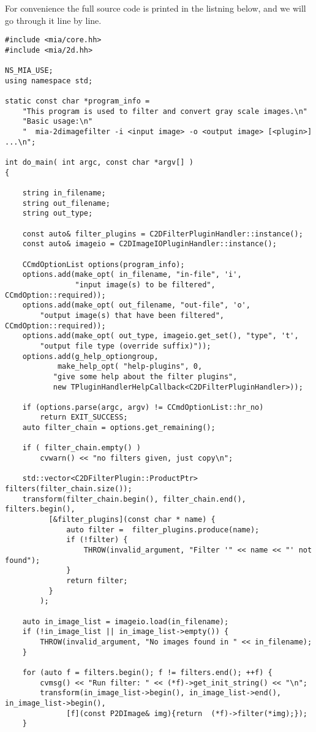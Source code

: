 \documentclass[english, 10pt, a4paper,headsepline,openany]{scrbook}
\begin{document}
For convenience the full source code is printed in the listning below, and we will go through it line by line. 
\lstset{language=c++,basicstyle=\small,numberstyle=\small}
\begin{lstlisting}
#include <mia/core.hh>
#include <mia/2d.hh>

NS_MIA_USE;
using namespace std;

static const char *program_info = 
	"This program is used to filter and convert gray scale images.\n"
	"Basic usage:\n"
	"  mia-2dimagefilter -i <input image> -o <output image> [<plugin>] ...\n"; 

int do_main( int argc, const char *argv[] )
{

	string in_filename;
	string out_filename;
	string out_type;

	const auto& filter_plugins = C2DFilterPluginHandler::instance();
	const auto& imageio = C2DImageIOPluginHandler::instance();

	CCmdOptionList options(program_info);
	options.add(make_opt( in_filename, "in-file", 'i', 
                "input image(s) to be filtered", CCmdOption::required));
	options.add(make_opt( out_filename, "out-file", 'o',
		"output image(s) that have been filtered", CCmdOption::required));
	options.add(make_opt( out_type, imageio.get_set(), "type", 't',
		"output file type (override suffix)"));
	options.add(g_help_optiongroup, 
	        make_help_opt( "help-plugins", 0,
		   "give some help about the filter plugins", 
	  	   new TPluginHandlerHelpCallback<C2DFilterPluginHandler>));
	
	if (options.parse(argc, argv) != CCmdOptionList::hr_no)
		return EXIT_SUCCESS; 
	auto filter_chain = options.get_remaining();

	if ( filter_chain.empty() )
		cvwarn() << "no filters given, just copy\n";

	std::vector<C2DFilterPlugin::ProductPtr> filters(filter_chain.size());
	transform(filter_chain.begin(), filter_chain.end(), filters.begin(),
		  [&filter_plugins](const char * name) {
			  auto filter =  filter_plugins.produce(name); 
			  if (!filter) {
				  THROW(invalid_argument, "Filter '" << name << "' not found"); 
			  }
			  return filter; 
		  }
		); 
		
	auto in_image_list = imageio.load(in_filename);
	if (!in_image_list || in_image_list->empty()) {
		THROW(invalid_argument, "No images found in " << in_filename); 
	}
	
	for (auto f = filters.begin(); f != filters.end(); ++f) {
		cvmsg() << "Run filter: " << (*f)->get_init_string() << "\n";
		transform(in_image_list->begin(), in_image_list->end(), in_image_list->begin(),
			  [f](const P2DImage& img){return  (*f)->filter(*img);}); 
	}
	

\end{lstlisting}
\end{document}
